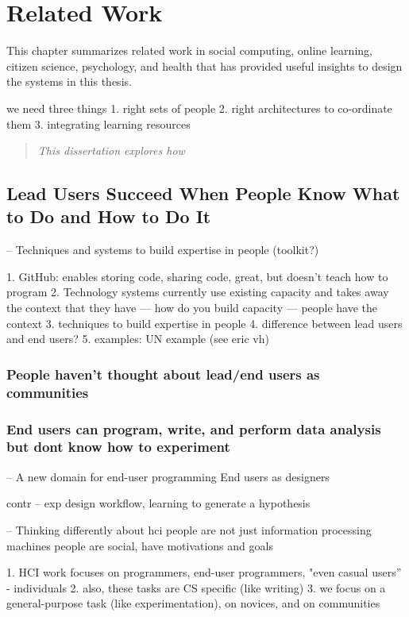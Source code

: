 
\chapter{Related Work}
This chapter summarizes related work in social computing, online learning, citizen science, psychology, and health that has provided useful insights to design the systems in this thesis.


we need three things
1. right sets of people
2. right architectures to co-ordinate them
3. integrating learning resources 


\begin{quote}
\emph{This dissertation explores how }

\end{quote}
\vspace{0.25in}

\section{Lead Users Succeed When People Know What to Do and How to Do It}
-- Techniques and systems to build expertise in people (toolkit?)

1. GitHub: enables storing code, sharing code, great, but doesn’t teach how to program
2. Technology systems currently use existing capacity and takes away the context that they have — how do you build capacity — people have the context 
3. techniques to build expertise in people
4. difference between lead users and end users? 
5. examples: UN example (see eric vh)

\subsection{People haven't thought about lead/end users as communities}

\subsection{End users can program, write, and perform data analysis but dont know how to experiment}
-- A new domain for end-user programming 
End users as designers

contr -- exp design workflow, learning to generate a hypothesis

-- Thinking differently about hci 
  people are not just information processing machines
  people are social, have motivations and goals

1. HCI work focuses on programmers, end-user programmers, "even casual users” - individuals
2. also, these tasks are CS specific (like writing)
3. we focus on a general-purpose task (like experimentation), on novices, and on communities


